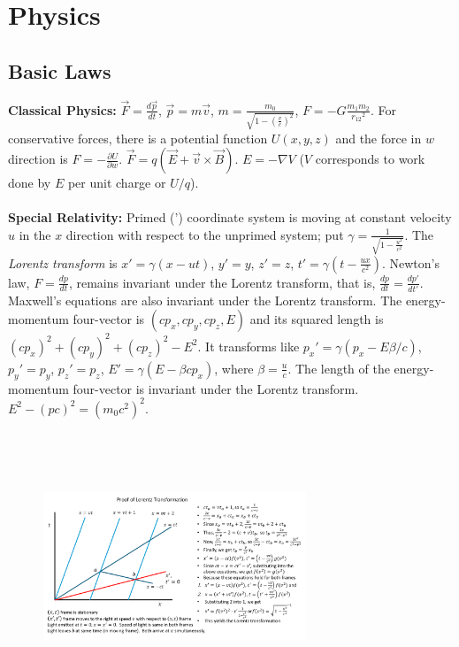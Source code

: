 \chapter{Physics}
\section{Basic Laws}
{\bf Classical Physics:}
${\vec F}= {\frac {d{\vec p}} {dt}}$, 
${\vec p}= m{\vec v}$,
$m= {\frac {m_{0}} {\sqrt {1 - ({\frac {v}{c}})^{2}}}}$,
$F= -G {\frac {m_{1} m_{2} } {{r_{12} }^{2} }}$.  For conservative
forces, there is a potential function $U(x,y,z)$ and the force in $w$ direction is
$F= - {\frac {\partial U} {\partial w}}$.
${\vec F}= q ( {\vec E} + {\vec v} \times {\vec B} )$.  $E= - \nabla V$ ($V$ corresponds
to work done by $E$ per unit charge or $U/q$).
\\
\\
{\bf Special Relativity:}
Primed (') coordinate system is moving at constant velocity $u$ in the $x$ 
direction with respect to the unprimed system; put $\gamma= {\frac 1
{\sqrt {1-{\frac {u^2} {c^2}}}}}$. The \emph{Lorentz transform} is
$x'= \gamma (x-ut)$,
$y'= y$, $z'= z$, $t'= \gamma (t-{\frac {ux} {c^2}})$. Newton's law, $F= {\frac {dp} {dt}}$, 
remains invariant under the Lorentz transform, that is,
${\frac {dp} {dt}}= {\frac {dp'} {dt'}}$.
Maxwell's equations are also invariant under
the Lorentz transform.
The energy-momentum four-vector is
$(cp_x, cp_y, cp_z, E) $ and its squared
length is $(cp_x)^2+(cp_y)^2+(cp_z)^2-E^2$.  It transforms like
$p_x'= \gamma (p_x-E \beta/c)$,
$p_y'= p_y$,
$p_z'= p_z$,
$E'= \gamma (E-\beta c p_x)$, where $\beta= {\frac {u} {c}}$.
The length of the energy-momentum four-vector
is invariant under the Lorentz transform.
$E^{2} - (p c)^{2} = { (m_0 c^{2} ) }^{2}$.
\\
\\
\begin{figure} 
\center
\includegraphics[width=0.7\textwidth,natwidth=642,natheight=610, height=70mm, width=85mm]{Lorentz.pdf}
\end{figure}
